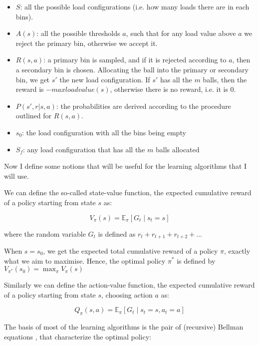 \begin{itemize}
    \item 
    $S$: all the possible load configurations (i.e. how many loads there are in each bins).
    \item
    $A(s)$: all the possible thresholds $a$, such that for any load value above $a$ we reject the primary bin, otherwise we accept it.
    \item
    $R(s, a)$: a primary bin is sampled, and if it is rejected according to $a$, then a secondary bin is chosen. Allocating the ball into the primary or secondary bin, we get $s'$ the new load configuration. If $s'$ has all the $m$ balls, then the reward is $-maxloadvalue(s)$, otherwise there is no reward, i.e. it is $0$.
    \item
    $P(s', r | s, a)$: the probabilities are derived according to the procedure outlined for $R(s,a)$.
    \item
    $s_0$: the load configuration with all the bins being empty
    \item
    $S_f$: any load configuration that has all the $m$ balls allocated
\end{itemize}


Now I define some notions that will be useful for the learning algorithms that I will use.


We can define the so-called state-value function, the expected cumulative reward of a policy starting from state $s$ as:

\begin{equation}\label{eq:statevalueFunction}
V_{\pi}(s)=\mathbb{E}_\pi[G_t \mid s_t = s]
\end{equation}

where the random variable $G_t$ is defined as $r_{t} +  r_{t+1} + r_{t+2} + ...$

When $s=s_0$, we get the expected total cumulative reward of a policy $\pi$, exactly what we aim to maximise. Hence, the optimal policy $\pi^*$ is defined by $V_{\pi^*}(s_0)=\max_\pi V_{\pi}(s)$


Similarly we can define the action-value function, the expected cumulative reward of a policy starting from state $s$, choosing action $a$ as:

\begin{equation}\label{eq:actionvalueFunction}
Q_{\pi}(s, a)=\mathbb{E}_\pi[G_t \mid s_t = s, a_t = a]
\end{equation}


The basis of most of the learning algorithms is the pair of (recursive) Bellman equations \cite{bellman1957bellmanequation}, that characterize the optimal policy:


